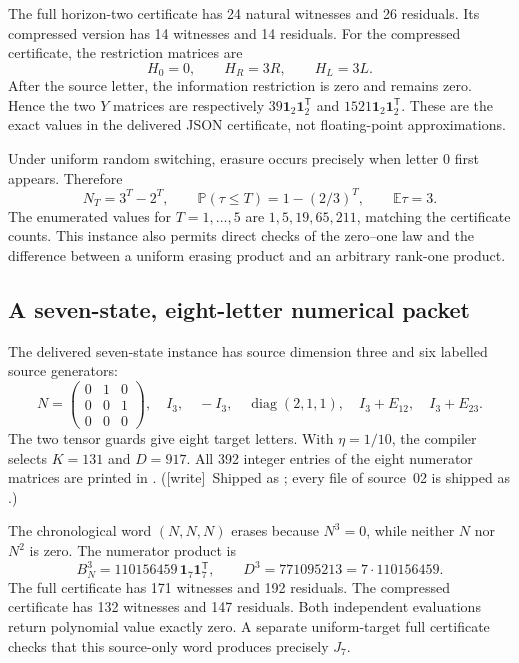 \documentclass[11pt,letterpaper]{article}
\theoremstyle{definition}
\theoremstyle{remark}
\newcommand{\one}{\mathbf 1}
\DeclareMathOperator{\diag}{diag}
\newcommand{\EE}{\mathbb E}
\newcommand{\PP}{\mathbb P}
\newcommand{\transpose}{^{\mathsf T}}
\newcommand{\wtag}{\textup{[write]}}
\begin{document}
The full horizon-two certificate has 24 natural witnesses and 26 residuals.
Its compressed version has 14 witnesses and 14 residuals. For the compressed
certificate, the restriction matrices are
\[
 H_0=0,\qquad H_R=3R,\qquad H_L=3L.
\]
After the source letter, the information restriction is zero and remains zero.
Hence the two $Y$ matrices are respectively $39\one_2\one_2\transpose$ and
$1521\one_2\one_2\transpose$. These are the exact values in the delivered JSON
certificate, not floating-point approximations.

Under uniform random switching, erasure occurs precisely when letter $0$ first
appears. Therefore
\[
 N_T=3^T-2^T,\qquad \PP(\tau\leq T)=1-(2/3)^T,\qquad \EE\tau=3.
\]
The enumerated values for $T=1,\ldots,5$ are $1,5,19,65,211$, matching the
certificate counts. This instance also permits direct checks of the zero--one
law and the difference between a uniform erasing product and an arbitrary
rank-one product.

\subsection{A seven-state, eight-letter numerical packet}

The delivered seven-state instance has source dimension three and six labelled
source generators:
\[
 N=\begin{pmatrix}0&1&0\\0&0&1\\0&0&0\end{pmatrix},\quad
 I_3,\quad -I_3,\quad \diag(2,1,1),\quad I_3+E_{12},\quad I_3+E_{23}.
\]
The two tensor guards give eight target letters. With $\eta=1/10$, the compiler
selects $K=131$ and $D=917$. All 392 integer entries of the eight numerator
matrices are printed in . (\wtag\ Shipped as ; every  file of source~02 is shipped as .)

The chronological word $(N,N,N)$ erases because $N^3=0$, while neither $N$ nor
$N^2$ is zero. The numerator product is
\[
 B_N^3=110156459\,\one_7\one_7\transpose,
 \qquad D^3=771095213=7\cdot110156459.
\]
The full certificate has 171 witnesses and 192 residuals. The compressed
certificate has 132 witnesses and 147 residuals. Both independent evaluations
return polynomial value exactly zero. A separate uniform-target full certificate
checks that this source-only word produces precisely $J_7$.
\end{document}
